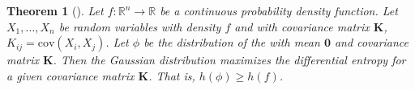 \documentclass[12pt]{article}
\newcommand{\mv}[1]{\mathbf{#1}}	%
\newcommand{\cov}{\mathrm{cov}}
\begin{document}
\newtheorem{thm}{Theorem}
\begin{thm}[]
Let $f:\mathbb{R}^n \to \mathbb{R}$ be a continuous probability
density function. Let $X_1, \ldots, X_n$ be random variables with density $f$
and with covariance matrix $\mv{K}$, $K_{ij} = \cov(X_i, X_j)$.  Let $\phi$ be the distribution of the 
  with mean $\mv{0}$ and covariance matrix $\mv{K}$.  Then the  Gaussian distribution maximizes the differential entropy for a given covariance matrix $\mv{K}$.  That is, $h(\phi) \ge h(f)$.
\end{thm}
\end{document}
